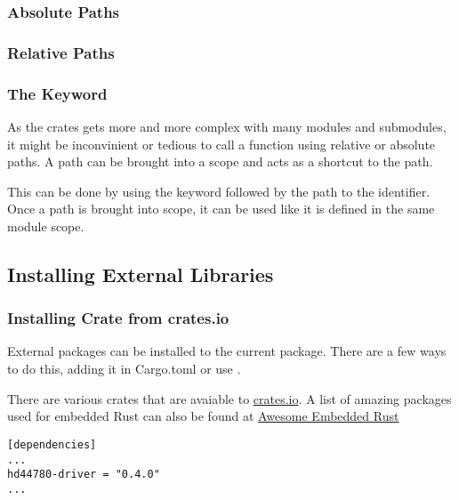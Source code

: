 \documentclass{beamer}
\begin{document}
\begin{frame}
  \frametitle{Absolute Paths}
  
  
\end{frame}

\begin{frame}
  \frametitle{Relative Paths}
  
  
  
\end{frame}

\begin{frame}
  \frametitle{The  Keyword}
  As the crates gets more and more complex with many modules and submodules, it might be inconvinient or tedious to call a function using relative or absolute paths. A path can be brought into a scope and acts as a shortcut to the path.

  This can be done by using the  keyword followed by the path to the identifier. Once a path is brought into scope, it can be used like it is defined in the same module scope.
  
\end{frame}

\subsection{Installing External Libraries}
\begin{frame}[fragile]
  \frametitle{Installing Crate from crates.io}
  External packages can be installed to the current package. There are a few ways to do this, adding it in Cargo.toml or use .

  There are various crates that are avaiable to \href{crates.io}{crates.io}. A list of amazing packages used for embedded Rust can also be found at \href{https://github.com/rust-embedded/awesome-embedded-rust}{Awesome Embedded Rust}

\begin{lstlisting}[caption={Adding Dependencies in Cargo.toml}]
[dependencies]
...
hd44780-driver = "0.4.0"
...
\end{lstlisting}
\end{frame}
\end{document}
